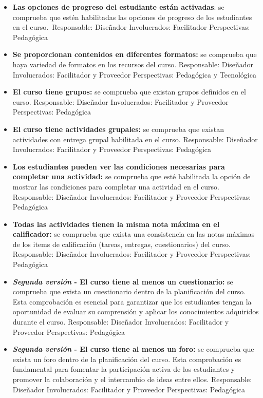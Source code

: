 \begin{itemize}
	\item
	\textbf{Las opciones de progreso del estudiante están activadas}: se
	comprueba que estén habilitadas las opciones de progreso de los
	estudiantes en el curso.~{Responsable:} Diseñador
	{Involucrados:} Facilitador {Perspectivas:} Pedagógica
	\item
	\textbf{Se proporcionan contenidos en diferentes formatos:} se
	comprueba que haya variedad de formatos en los recursos del curso.
	{Responsable:} Diseñador {Involucrados:} Facilitador y
	Proveedor {Perspectivas:} Pedagógica y Tecnológica
	\item
	\textbf{El curso tiene grupos:} se comprueba que existan grupos
	definidos en el curso. {Responsable:} Diseñador
	{Involucrados:} Facilitador y Proveedor {Perspectivas:}
	Pedagógica
	\item
	\textbf{El curso tiene actividades grupales:} se comprueba que existan
	actividades con entrega grupal habilitada en el curso.
	{Responsable:} Diseñador {Involucrados:} Facilitador y
	Proveedor {Perspectivas:} Pedagógica
	\item
	\textbf{Los estudiantes pueden ver las condiciones necesarias para
		completar una actividad:} se comprueba que esté habilitada la opción
	de mostrar las condiciones para completar una actividad en el curso.
	{Responsable:} Diseñador {Involucrados:} Facilitador y
	Proveedor {Perspectivas:} Pedagógica
	\item
	\textbf{Todas las actividades tienen la misma nota máxima en el
		calificador:} se comprueba que exista una consistencia en las notas
	máximas de los items de calificación (tareas, entregas, cuestionarios)
	del curso. {Responsable:} Diseñador {Involucrados:}
	Facilitador y Proveedor {Perspectivas:} Pedagógica
	\item
	\textbf{\textit{Segunda versión} - El curso tiene al menos un cuestionario:} se comprueba que exista un cuestionario dentro de la planificación del curso. Esta comprobación es esencial para garantizar que los estudiantes tengan la oportunidad de evaluar su comprensión y aplicar los conocimientos adquiridos durante el curso.
    {Responsable:} Diseñador {Involucrados:} Facilitador y Proveedor {Perspectivas:} Pedagógica
	\item
	\textbf{\textit{Segunda versión} - El curso tiene al menos un foro:} se comprueba que exista un foro dentro de la planificación del curso. Esta comprobación es fundamental para fomentar la participación activa de los estudiantes y promover la colaboración y el intercambio de ideas entre ellos.
    {Responsable:} Diseñador {Involucrados:} Facilitador y Proveedor {Perspectivas:} Pedagógica
\end{itemize}

